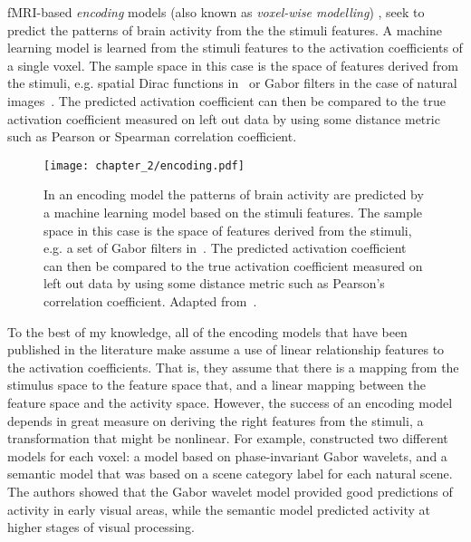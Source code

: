 fMRI-based \emph{encoding} models (also known as \emph{voxel-wise modelling}) \citep{thirion2006, Kay2008, mitchell2008predicting}, seek to predict the patterns of brain activity from the the stimuli features. A machine learning model is learned from the stimuli features to the \gls{activation coefficient}s of a single voxel.
The sample space in this case is the space of features derived from the stimuli, e.g. spatial Dirac functions in~\citep{thirion2006} or Gabor filters in the case of natural images~\citep{Kay2008, Naselaris2014}. The predicted activation coefficient can then be compared to the true activation coefficient measured on left out data by using some distance metric such as Pearson or Spearman correlation coefficient.


\begin{figure}
\texttt{[image: chapter\_2/encoding.pdf]}
\caption{ In an encoding model the patterns of brain activity are predicted by a machine learning model based on the stimuli features. The sample space in this case is the space of features derived from the stimuli, e.g. a set of Gabor filters in~\citep{Kay2008}. The predicted activation coefficient can then be compared to the true activation coefficient measured on left out data by using some distance metric such as Pearson's correlation coefficient. Adapted from~\citep{smith2013reading}.}\label{fig:c2_encoding}
\end{figure}

To the best of my knowledge, all of the encoding models that have been
published in the literature make assume a use of linear relationship features to the activation coefficients. That is, they assume that there is a  mapping from the stimulus space to the feature space that, and a linear mapping between the feature space and the activity space. However, the success of an encoding model depends in great measure on deriving the right features from the stimuli, a transformation that might be nonlinear. For example, \citet{naselaris2009bayesian} constructed two different models for each voxel: a model based on phase-invariant Gabor wavelets, and a semantic model that was based on a scene category label for each natural scene. The authors showed that the Gabor wavelet model provided good predictions of activity in early visual areas, while the semantic model predicted activity at higher stages of visual processing. 

